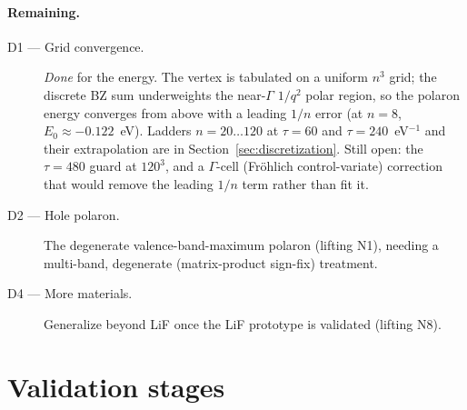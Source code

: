 \documentclass[11pt]{article}
\begin{document}
\paragraph{Remaining.}
\begin{description}
  \item[D1 --- Grid convergence.] \emph{Done} for the energy. The vertex is tabulated on a uniform $n^{3}$ grid; the discrete BZ sum underweights the near-$\Gamma$ $1/q^{2}$ polar region, so the polaron energy converges from above with a leading $1/n$ error (at $n{=}8$, $E_{0}\approx-0.122$~eV). Ladders $n=20\ldots120$ at $\tau=60$ and $\tau=240$~eV$^{-1}$ and their extrapolation are in Section~\ref{sec:discretization}. Still open: the $\tau{=}480$ guard at $120^{3}$, and a $\Gamma$-cell (Fr\"ohlich control-variate) correction that would remove the leading $1/n$ term rather than fit it.

  \item[D2 --- Hole polaron.] The degenerate valence-band-maximum polaron (lifting N1),
    needing a multi-band, degenerate (matrix-product sign-fix) treatment.

  \item[D4 --- More materials.] Generalize beyond LiF once the LiF prototype is validated
    (lifting N8).
\end{description}

\section{Validation stages}
\label{sec:validation}
\end{document}

